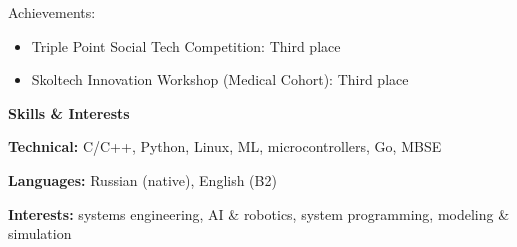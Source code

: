 \documentclass[11pt]{article}
\begin{document}
Achievements:
\begin{itemize}[noitemsep, topsep=0pt, partopsep=0pt, parsep=0pt]
  \item Triple Point Social Tech Competition: Third place
  \item Skoltech Innovation Workshop (Medical Cohort): Third place
\end{itemize}

\begin{center}
  \textbf{Skills \& Interests}
\end{center}

\textbf{Technical:} C/C++, Python, Linux, ML, microcontrollers, Go, MBSE

\textbf{Languages:} Russian (native), English (B2)

\textbf{Interests:} systems engineering, AI \& robotics, system programming, modeling \& simulation
\end{document}
